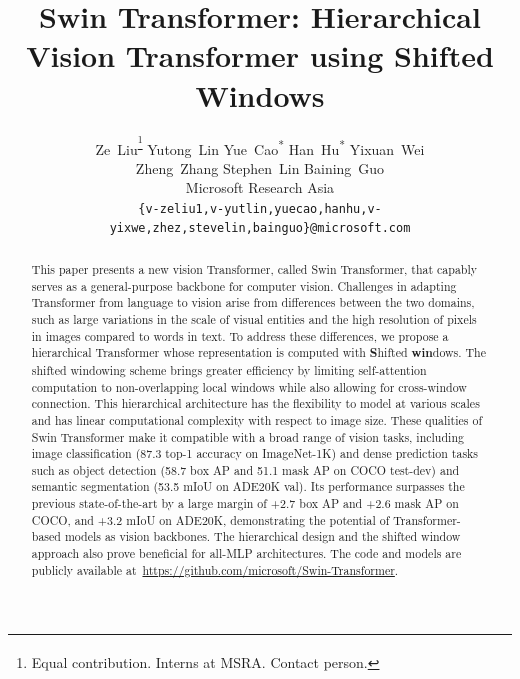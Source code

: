 \documentclass[10pt,twocolumn,letterpaper]{article}
\begin{document}
\title{Swin Transformer: Hierarchical Vision Transformer using Shifted Windows}

\author{
Ze~Liu\textsuperscript{\dag\thanks{Equal contribution. \textsuperscript{\dag}Interns at MSRA. \textsuperscript{\ddag}Contact person.}}
\quad Yutong~Lin\textsuperscript{\dag*} \quad Yue~Cao\textsuperscript{*}
\quad Han~Hu\textsuperscript{*\ddag}
\quad Yixuan~Wei\textsuperscript{\dag} \\
\quad Zheng~Zhang
\quad Stephen~Lin
\quad Baining~Guo\\
{Microsoft Research Asia} \\
\small{\texttt{\{v-zeliu1,v-yutlin,yuecao,hanhu,v-yixwe,zhez,stevelin,bainguo\}@microsoft.com}}
}

\maketitle

\ificcvfinal\thispagestyle{empty}\fi

\begin{abstract}
This paper presents a new vision Transformer, called Swin Transformer, that capably serves as a general-purpose backbone for computer vision. Challenges in adapting Transformer from language to vision arise from differences between the two domains, such as large variations in the scale of visual entities and the high resolution of pixels in images compared to words in text. To address these differences, we propose a hierarchical Transformer whose representation is computed with \textbf{S}hifted \textbf{win}dows. The shifted windowing scheme brings greater efficiency by limiting self-attention computation to non-overlapping local windows while also allowing for cross-window connection. This hierarchical architecture has the flexibility to model at various scales and has linear computational complexity with respect to image size.
These qualities of Swin Transformer make it compatible with a broad range of vision tasks, including image classification (87.3 top-1 accuracy on ImageNet-1K) and dense prediction tasks such as object detection (58.7 box AP and 51.1 mask AP on COCO test-dev) and semantic segmentation (53.5 mIoU on ADE20K val). Its performance surpasses the previous state-of-the-art by a large margin of +2.7 box AP and +2.6 mask AP on COCO, and +3.2 mIoU on ADE20K, demonstrating the potential of Transformer-based models as vision backbones. The hierarchical design and the shifted window approach also prove beneficial for all-MLP architectures. The code and models are publicly available at~\url{https://github.com/microsoft/Swin-Transformer}.
\end{abstract}
\end{document}
